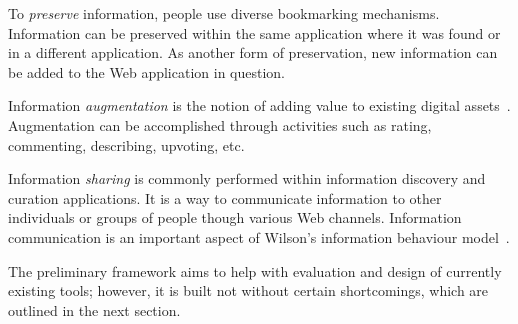 {To \textit{preserve} information, people use diverse bookmarking mechanisms. Information can be preserved within the same application where it was found or in a different application. As another form of preservation, new information can be added to the Web application in question.

Information \textit{augmentation} is the notion of adding value to existing digital assets~\citep{beagrie2008digital}. Augmentation can be accomplished through activities such as rating, commenting, describing, upvoting, etc.  

Information \textit{sharing} is commonly performed within information discovery and curation applications. It is a way to communicate information to other individuals or groups of people though various Web channels. Information communication is an important aspect of Wilson's information behaviour model~\cite{wilson1981user}.

The preliminary framework aims to help with evaluation and design of currently existing tools; however, it is built not without certain shortcomings, which are outlined in the next section.

} %
